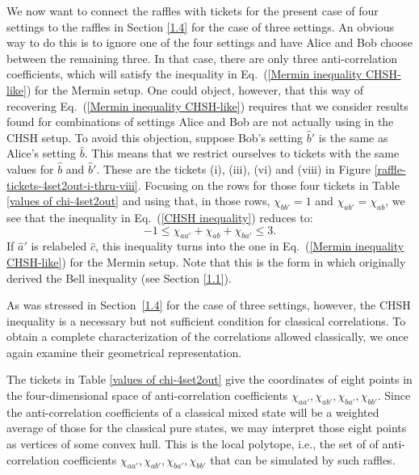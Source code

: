 We now want to connect the raffles with tickets for the present case of four settings to the raffles in Section \ref{1.4} for the case of three settings. An obvious way to do this is to ignore one of the four settings and have Alice and Bob choose between the remaining three. In that case, there are only three anti-correlation coefficients, which will satisfy the inequality in Eq.\ (\ref{Mermin inequality CHSH-like}) for the Mermin setup. One could object, however, that this way of recovering Eq.\ (\ref{Mermin inequality CHSH-like}) requires that we consider results found for combinations of settings Alice and Bob are not actually using in the CHSH setup. To avoid this objection, suppose Bob's setting $\hat{b}'$ is the same as Alice's setting $\hat{b}$. This means that we restrict ourselves to tickets with the same values for $\hat{b}$ and $\hat{b}'$. These are the tickets (i), (iii), (vi) and (viii) in Figure \ref{raffle-tickets-4set2out-i-thru-viii}. Focusing on the rows for those four tickets in Table \ref{values of chi-4set2out} and using that, in those rows, $\chi_{bb'} = 1$ and $\chi_{ab'} = \chi_{ab}$, we see that the inequality in Eq.\ (\ref{CHSH inequality}) reduces to:
\begin{equation}
-1 \le \chi_{aa'} + \chi_{ab} + \chi_{ba'} \le 3.
\label{CHSH2Bell}
\end{equation}
If $\hat{a}'$ is relabeled $\hat{c}$, this inequality turns into the one in Eq.\ (\ref{Mermin inequality CHSH-like}) for the Mermin setup. Note that this is the form in which \citet{Bell 1964} originally derived the Bell inequality (see Section \ref{1.1}).

As was stressed in Section\ \ref{1.4} for the case of three settings, however, the CHSH inequality is a necessary but not sufficient condition for classical correlations. To obtain a complete characterization of the correlations allowed classically, we once again examine their geometrical representation.

The tickets in Table \ref{values of chi-4set2out} give the coordinates of eight points in the four-dimensional space of anti-correlation coefficients $\chi_{aa'},\chi_{ab'},\chi_{ba'},\chi_{bb'}$. Since the anti-correlation coefficients of a classical mixed state will be a weighted average of those for the classical pure states, we may interpret those eight points as vertices of some convex hull. This is the local polytope, i.e., the set of of anti-correlation coefficients $\chi_{aa'},\chi_{ab'},\chi_{ba'},\chi_{bb'}$ that can be simulated by such raffles.


